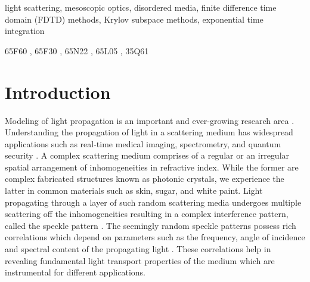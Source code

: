 \documentclass[11pt]{elsarticle}
\begin{document}
\begin{frontmatter}
\begin{keyword}
light scattering\sep
mesoscopic optics\sep
disordered media\sep
finite difference time domain (FDTD) methods\sep 
Krylov subspace methods\sep 
exponential time integration

\MSC[2008]
65F60 \sep %
65F30 \sep %
65N22 \sep %
65L05 \sep %
35Q61      %
\end{keyword}
\end{frontmatter}



\section{Introduction}
Modeling of light propagation is an
important and ever-growing research area \cite{Chew2001,Taflove}. Understanding 
the propagation of light in a scattering medium has widespread 
applications such as real-time medical imaging,
spectrometry, and quantum security \cite{bertolotti2012non, katz2014non, 
yilmaz2015speckle, redding2013compact, goorden2014quantum}.
A complex scattering medium comprises of a regular or an irregular spatial 
arrangement of inhomogeneities in refractive index. While the former are 
complex fabricated structures known as photonic crystals, we experience the 
latter in common materials such as skin, sugar, and white paint.
Light propagating through a layer of such random scattering media
undergoes multiple scattering off the inhomogeneities resulting in a complex 
interference pattern, called the 
speckle pattern \cite{akkermans2007mesoscopic}.
The seemingly random speckle patterns
possess rich correlations which depend on parameters such as the frequency, 
angle of incidence and spectral content of the propagating light 
\cite{freund1988memory, van1999multiple, dogariu2015electromagnetic, 
Gigan2016}. These correlations help in revealing fundamental 
light transport properties of the medium which are instrumental
for different applications.
\end{document}
